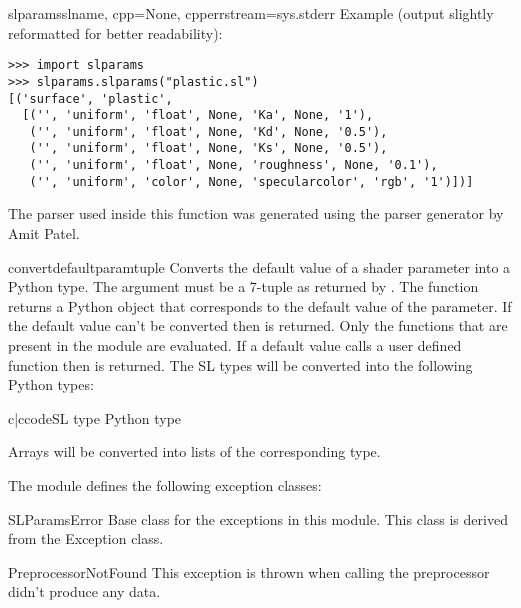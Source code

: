 \begin{funcdesc}{slparams}{slname, cpp=None, cpperrstream=sys.stderr}
Example (output slightly reformatted for better readability):
 
\begin{verbatim}
>>> import slparams
>>> slparams.slparams("plastic.sl")
[('surface', 'plastic', 
  [('', 'uniform', 'float', None, 'Ka', None, '1'),
   ('', 'uniform', 'float', None, 'Kd', None, '0.5'),
   ('', 'uniform', 'float', None, 'Ks', None, '0.5'),
   ('', 'uniform', 'float', None, 'roughness', None, '0.1'),
   ('', 'uniform', 'color', None, 'specularcolor', 'rgb', '1')])]
\end{verbatim}

The parser used inside this function was generated using the parser
generator  
by Amit Patel.
\end{funcdesc}

\begin{funcdesc}{convertdefault}{paramtuple}
Converts the default value of a shader parameter into a Python
type. The argument  must be a 7-tuple as returned by
. The function returns a Python object that corresponds to
the default value of the parameter. If the default value can't be
converted then  is returned. Only the functions that are
present in the  module are evaluated. If a default value
calls a user defined function then  is returned. The SL
types will be converted into the following Python types:

\begin{tableii}{c|c}{code}{SL type }{ Python type}
\end{tableii}

Arrays will be converted into lists of the corresponding type.
\end{funcdesc}

The module defines the following exception classes:

\begin{excdesc}{SLParamsError}
Base class for the exceptions in this module. This class is derived
from the Exception class.
\end{excdesc}

\begin{excdesc}{PreprocessorNotFound}
This exception is thrown when calling the preprocessor didn't produce
any data.
\end{excdesc}

